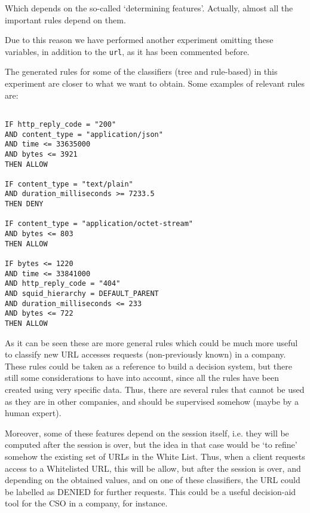 \documentclass{llncs}
\begin{document}
Which depends on the so-called `determining features'. Actually, almost all the important rules depend on them.

Due to this reason we have performed another experiment omitting these variables, in addition to the \texttt{url}, as it has been commented before.

The generated rules for some of the classifiers (tree and rule-based) in this experiment are closer to what we want to obtain. Some examples of relevant rules are:

\begin{small}
\begin{verbatim}

IF http_reply_code = "200"
AND content_type = "application/json"
AND time <= 33635000
AND bytes <= 3921
THEN ALLOW

IF content_type = "text/plain"
AND duration_milliseconds >= 7233.5 
THEN DENY

IF content_type = "application/octet-stream"
AND bytes <= 803
THEN ALLOW

IF bytes <= 1220
AND time <= 33841000
AND http_reply_code = "404"
AND squid_hierarchy = DEFAULT_PARENT
AND duration_milliseconds <= 233
AND bytes <= 722
THEN ALLOW
\end{verbatim}
\end{small}

As it can be seen these are more general rules which could be much more useful to classify new URL accesses requests (non-previously known) in a company.
These rules could be taken as a reference to build a decision system, but there still some considerations to have into account, since all the rules have been created using very specific data. Thus, there are several rules that cannot be used as they are in other companies, and should be supervised somehow (maybe by a human expert).

Moreover, some of these features depend on the session itself, i.e. they will be computed after the session is over, but the idea in that case would be `to refine' somehow the existing set of URLs in the White List.
Thus, when a client requests access to a Whitelisted URL, this will be allow, but after the session is over, and depending on the obtained values, and on one of these classifiers, the URL could be labelled as DENIED for further requests.
This could be a useful decision-aid tool for the CSO in a company, for instance.

%
\end{document}

